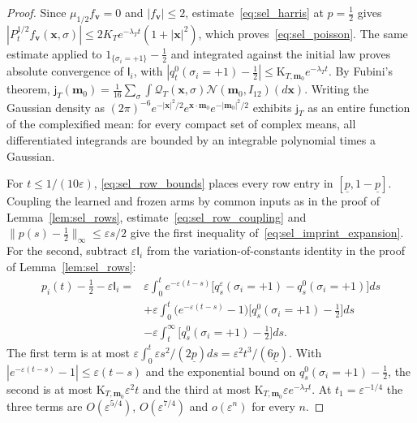 \begin{proof}
Since $\mu_{1/2}f_{\mathbf v}=0$ and $|f_{\mathbf v}|\le2$, estimate~\eqref{eq:sel_harris} at $p=\frac12$ gives $|P^{1/2}_tf_{\mathbf v}(\mathbf x,\sigma)|\le2K_Te^{-\lambda_Tt}(1+|\mathbf x|^2)$, which proves~\eqref{eq:sel_poisson}. The same estimate applied to $1_{\{\sigma_i=+1\}}-\frac12$ and integrated against the initial law proves absolute convergence of $\mathsf I_i$, with $|q^0_t(\sigma_i=+1)-\frac12|\le\mathrm K_{T,\mathbf m_0}e^{-\lambda_Tt}$. By Fubini's theorem, $\mathsf j_T(\mathbf m_0)=\frac1{16}\sum_\sigma\int\mathcal Q_T(\mathbf x,\sigma)\mathcal N(\mathbf m_0,I_{12})(d\mathbf x)$. Writing the Gaussian density as $(2\pi)^{-6}e^{-|\mathbf x|^2/2}e^{\mathbf x\cdot\mathbf m_0}e^{-|\mathbf m_0|^2/2}$ exhibits $\mathsf j_T$ as an entire function of the complexified mean: for every compact set of complex means, all differentiated integrands are bounded by an integrable polynomial times a Gaussian.

For $t\le1/(10\varepsilon)$, \eqref{eq:sel_row_bounds} places every row entry in $[\underline p,1-\underline p]$. Coupling the learned and frozen arms by common inputs as in the proof of Lemma~\ref{lem:sel_rows}, estimate~\eqref{eq:sel_row_coupling} and $\|p(s)-\frac12\|_\infty\le\varepsilon s/2$ give the first inequality of~\eqref{eq:sel_imprint_expansion}. For the second, subtract $\varepsilon\mathsf I_i$ from the variation-of-constants identity in the proof of Lemma~\ref{lem:sel_rows}:
\[
\begin{aligned}
p_i(t)-\tfrac12-\varepsilon\mathsf I_i
={}&\varepsilon\int_0^te^{-\varepsilon(t-s)}\bigl[q^\varepsilon_s(\sigma_i=+1)-q^0_s(\sigma_i=+1)\bigr]ds\\
&+\varepsilon\int_0^t\bigl(e^{-\varepsilon(t-s)}-1\bigr)\bigl[q^0_s(\sigma_i=+1)-\tfrac12\bigr]ds\\
&-\varepsilon\int_t^\infty\bigl[q^0_s(\sigma_i=+1)-\tfrac12\bigr]ds.
\end{aligned}
\]
The first term is at most $\varepsilon\int_0^t\varepsilon s^2/(2\underline p)ds=\varepsilon^2t^3/(6\underline p)$. With $|e^{-\varepsilon(t-s)}-1|\le\varepsilon(t-s)$ and the exponential bound on $q^0_s(\sigma_i=+1)-\frac12$, the second is at most $\mathrm K_{T,\mathbf m_0}\varepsilon^2t$ and the third at most $\mathrm K_{T,\mathbf m_0}\varepsilon e^{-\lambda_Tt}$. At $t_1=\varepsilon^{-1/4}$ the three terms are $O(\varepsilon^{5/4})$, $O(\varepsilon^{7/4})$ and $o(\varepsilon^n)$ for every $n$.
\end{proof}

